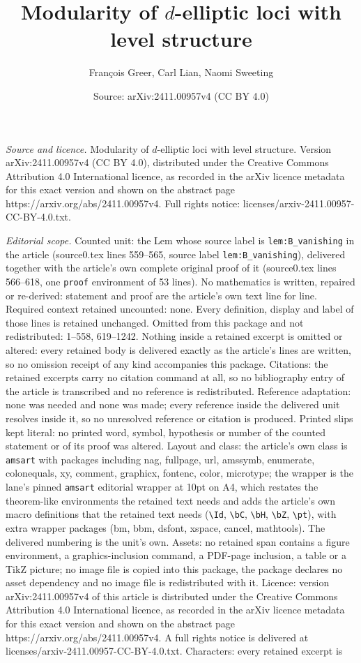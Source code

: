 \documentclass[10pt,a4paper]{amsart}
\title[Modularity of $d$-elliptic loci with level structure]{Modularity of $d$-elliptic loci with level structure}
\author{Fran\c{c}ois Greer, Carl Lian, Naomi Sweeting}
\date{Source: arXiv:2411.00957v4 (CC BY 4.0)}
\begin{document}
\maketitle

\noindent\emph{Source and licence.} Modularity of $d$-elliptic loci with level structure. Version arXiv:2411.00957v4 (CC BY 4.0), distributed under the Creative Commons Attribution 4.0 International licence, as recorded in the arXiv licence metadata for this exact version and shown on the abstract page https://arxiv.org/abs/2411.00957v4. Full rights notice: licenses/arxiv-2411.00957-CC-BY-4.0.txt.\par\smallskip

\noindent\textit{Editorial scope.} Counted unit: the Lem whose source label is \texttt{lem:B\_vanishing} in the article (source0.tex lines 559--565, source label \texttt{lem:B\_vanishing}), delivered together with the article's own complete original proof of it (source0.tex lines 566--618, one \texttt{proof} environment of 53 lines). No mathematics is written, repaired or re-derived: statement and proof are the article's own text line for line. Required context retained uncounted: none. Every definition, display and label of those lines is retained unchanged. Omitted from this package and not redistributed: 1--558, 619--1242. Nothing inside a retained excerpt is omitted or altered: every retained body is delivered exactly as the article's lines are written, so no omission receipt of any kind accompanies this package. Citations: the retained excerpts carry no citation command at all, so no bibliography entry of the article is transcribed and no reference is redistributed. Reference adaptation: none was needed and none was made; every reference inside the delivered unit resolves inside it, so no unresolved reference or citation is produced. Printed slips kept literal: no printed word, symbol, hypothesis or number of the counted statement or of its proof was altered. Layout and class: the article's own class is \texttt{amsart} with packages including nag, fullpage, url, amssymb, enumerate, colonequals, xy, comment, graphicx, fontenc, color, microtype; the wrapper is the lane's pinned \texttt{amsart} editorial wrapper at 10pt on A4, which restates the theorem-like environments the retained text needs and adds the article's own macro definitions that the retained text needs (\texttt{\textbackslash Id}, \texttt{\textbackslash bC}, \texttt{\textbackslash bH}, \texttt{\textbackslash bZ}, \texttt{\textbackslash pt}), with extra wrapper packages (bm, bbm, dsfont, xspace, cancel, mathtools). The delivered numbering is the unit's own. Assets: no retained span contains a figure environment, a graphics-inclusion command, a PDF-page inclusion, a table or a TikZ picture; no image file is copied into this package, the package declares no asset dependency and no image file is redistributed with it. Licence: version arXiv:2411.00957v4 of this article is distributed under the Creative Commons Attribution 4.0 International licence, as recorded in the arXiv licence metadata for this exact version and shown on the abstract page https://arxiv.org/abs/2411.00957v4. A full rights notice is delivered at licenses/arxiv-2411.00957-CC-BY-4.0.txt. Characters: every retained excerpt is 
\end{document}
